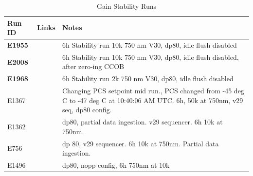 \begin{table}[ht]\label{table:runs_gainStability}
\centering
\caption{Gain Stability Runs}
\begin{tabular}{|p{1.5cm}|p{2.9cm}|p{9cm}|}
\hline
Run ID & Links & Notes \\ \hline
\textbf{E1955} & & 6h Stability run 10k 750 nm V30, dp80, idle flush disabled\\ \hline
\textbf{E2008} & & 6h Stability run 10k 750 nm V30, dp80, idle flush disabled, after zero-ing CCOB\\ \hline
\textbf{E1968} & & 6h Stability run 2k 750 nm V30, dp80, idle flush disabled\\ \hline
E1367 & & Changing PCS setpoint mid run., PCS changed from -45 deg C to -47 deg C at 10:40:06 AM UTC. 6h, 50k at 750nm, v29 seq, dp80 config. \\ \hline
E1362 & & dp80, partial data ingestion. v29 sequencer. 6h 10k at 750nm. \\ \hline
E756 & & dp 80, v29 sequencer. 6h 10k at 750nm. Partial data ingestion.\\ \hline
E1496 & & dp80, nopp config, 6h 750nm at 10k\\ \hline
\end{tabular}
\end{table}

